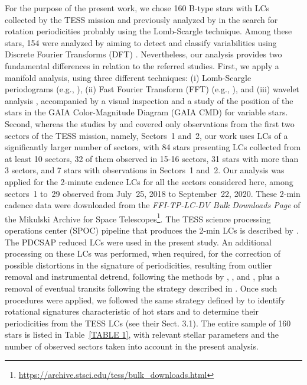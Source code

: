 \documentclass[RNAAS]{aastex63}
\begin{document}
For the purpose of the present work, we chose 160 B-type stars with LCs collected by the TESS mission and previously analyzed by \citet{Balona2020} in the search for rotation periodicities probably using the Lomb-Scargle technique. Among these stars, 154 were analyzed by \citet{Pedersen2019} aiming to detect and classify variabilities using Discrete Fourier Transforms (DFT) \citep{Kurtz1985}. Nevertheless, our analysis provides two fundamental differences in relation to the referred studies. First, we apply a manifold analysis, using three different techniques: (i) Lomb-Scargle periodograms (e.g., \citealp{Scargle1982,Horne1986,Press1989}), (ii) Fast Fourier Transform (FFT) (e.g., \citealp{Zhan2019}), and (iii) wavelet analysis \citep{Grossmann1984}, accompanied by a visual inspection and a study of the position of the stars in the GAIA Color-Magnitude Diagram (GAIA CMD) for variable stars. Second, whereas the studies by \citet{Balona2020} and \citet{Pedersen2019} covered only observations from the first two sectors of the TESS mission, namely, Sectors~1 and~2, our work uses LCs of a significantly larger number of sectors, with 84 stars presenting LCs collected from at least 10 sectors, 32 of them observed in 15-16 sectors, 31 stars with more than 3 sectors, and 7 stars with observations in Sectors~1 and~2. Our analysis was applied for the 2-minute cadence LCs for all the sectors considered here, among sectors~1 to~29 observed from July~25, 2018 to September~22, 2020. These 2-min cadence data were downloaded from the {\em FFI-TP-LC-DV Bulk Downloads Page} of the Mikulski Archive for Space Telescopes\footnote{\url{https://archive.stsci.edu/tess/bulk_downloads.html}}. The TESS science processing operations center (SPOC) pipeline that produces the 2-min LCs is described by \citet{Jenkins2016}. The PDCSAP reduced LCs were used in the present study. An additional processing on these LCs was performed, when required, for the correction of possible distortions in the signature of periodicities, resulting from outlier removal and instrumental detrend, following the methods by \citet{deMedeiros2013}, \citet{Paz-Chinchon2015}, and \citet{Canto2020}, plus a removal of eventual transits following the strategy described in \citet{Paz-Chinchon2015}. Once such procedures were applied, we followed the same strategy defined by \citet{Bowman2018} to identify rotational signatures characteristic of hot stars and to determine their periodicities from the TESS LCs (see their Sect. 3.1). The entire sample of 160 stars is listed in Table~\ref{TABLE 1}, with relevant stellar parameters and the number of observed sectors taken into account in the present analysis. 
\end{document}
